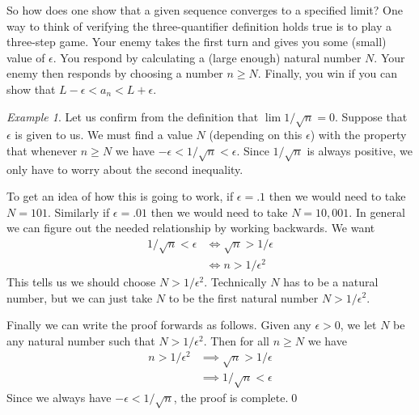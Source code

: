 \documentclass[11pt,oneside]{amsbook}
\theoremstyle{definition}
\theoremstyle{plain}
\theoremstyle{definition}
\theoremstyle{remark}
\newtheorem{example}[theorem]{Example}
\numberwithin{equation}{section}
\numberwithin{figure}{section}
\begin{document}
So how does one show that a given sequence converges to a specified limit? One way to think of verifying the three-quantifier definition holds true is to play a three-step game. Your enemy takes the first turn and gives you some (small) value of $\epsilon$. You respond by calculating a (large enough) natural number $N$. Your enemy then responds by choosing a number $n\geq N$. Finally, you win if you can show that $L-\epsilon<a_n<L+\epsilon$.

\begin{example}
  Let us confirm from the definition that $\lim1/\sqrt{n}=0$. Suppose that $\epsilon$ is given to us. We must find a value $N$ (depending on this $\epsilon$) with the property that whenever $n\geq N$ we have $-\epsilon<1/\sqrt{n}<\epsilon$. Since $1/\sqrt{n}$ is always positive, we only have to worry about the second inequality.

  To get an idea of how this is going to work, if $\epsilon=.1$ then we would need to take $N=101$. Similarly if $\epsilon=.01$ then we would need to take $N=10,001$. In general we can figure out the needed relationship by working backwards. We want
  \begin{align*}
    1/\sqrt{n}<\epsilon &\iff \sqrt{n}>1/\epsilon\\
                        &\iff n>1/\epsilon^2
  \end{align*}
  This tells us we should choose $N>1/\epsilon^2$. Technically $N$ has to be a natural number, but we can just take $N$ to be the first natural number $N>1/\epsilon^2$.

  Finally we can write the proof forwards as follows. Given any $\epsilon>0$, we let $N$ be any natural number such that $N>1/\epsilon^2$. Then for all $n\geq N$ we have
  \begin{align*}
    n>1/\epsilon^2&\implies\sqrt{n}>1/\epsilon\\
                  &\implies1/\sqrt{n}<\epsilon
  \end{align*}
  Since we always have $-\epsilon<1/\sqrt{n}$, the proof is complete.\qed
\end{example}
\end{document}
